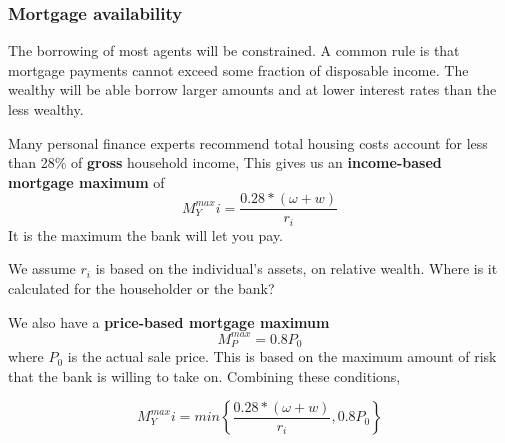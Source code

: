 




 
\subsubsection{Mortgage availability}\label{sssec-mortgage-availability}
The borrowing of most agents will be constrained. A common rule is that mortgage payments cannot exceed some fraction of disposable income. The wealthy will be able borrow larger amounts and at lower interest rates than the less wealthy.

Many personal finance experts recommend total housing costs account for less than 28\% of \textbf{gross} household income, This gives us an \textbf{income-based  mortgage maximum} of \[M^{max}_Yi = \frac{0.28*(\omega+w)}{r_i}\] It is the maximum the bank will let you pay.

We assume $r_i$ is based on the individual's assets, on relative wealth. Where is it calculated for the householder or the bank?

We also have  a \textbf{price-based mortgage maximum} \[M^{max}_P = 0.8P_0\] where $P_0$ is the actual sale price. This is based on the maximum amount of risk that the bank is willing to take on. Combining these conditions, %

\[M^{max}_Yi = min\left\{\frac{0.28*(\omega+w)}{r_i},  0.8P_0 \right\} \]


